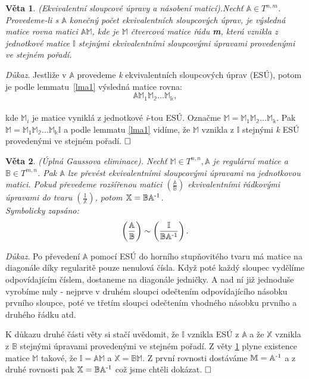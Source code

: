 \documentclass[12pt]{article}
\newtheorem{theorem}{Věta}[section]
\begin{document}
\begin{theorem}{\normalfont(Ekvivalentní sloupcové úpravy a násobení maticí).}\label{veta1}
Nechť  $\mathbb{A} \in T^{n,m}$. Provedeme-li s $\mathbb{A}$ konečný počet ekvivalentních sloupcových úprav, je výsledná matice rovna matici $\mathbb{AM}$, kde je $\mathbb{M}$ čtvercová matice řádu \textbf{m}, která vznikla z jednotkové matice $\mathbb{I}$ stejnými ekvivalentními sloupcovými úpravami provedenými ve stejném pořadí.
\end{theorem}

\textit{Důkaz}. Jestliže v $\mathbb{A}$ provedeme \textit{k} ekvivalentních sloupcových úprav (ESÚ), potom je podle lemmatu~\ref{lma1} výsledná matice rovna:
$$\mathbb{AM_\textit{1} M_\text{2} \dots M_\text{k},}$$
\\
kde $\mathbb{M_\textit{i}}$ je matice vyniklá z jednotkové \textit{i}-tou ESÚ.  Označme $\mathbb{M}=\mathbb{M_{\textit{1}} M_\text{2}  \dots M_\text{k}}$. Pak  \linebreak $\mathbb{M}=\mathbb{M_{\textit{1}} M_\text{2} \dots M_\text{k}I}$ a podle lemmatu \ref{lma1} vidíme, že $\mathbb{M}$ vznikla z $\mathbb{I}$ stejnými \textit{k} ESÚ provedenými ve stejném pořadí. $\hfill \Box$

\begin{theorem}{\normalfont(Úplná Gaussova eliminace).}
Nechť $\mathbb{M} \in T^{n,n}, \mathbb{A}$ je regulární matice a $\mathbb{B} \in T^{m,n}$. Pak $\mathbb{A}$ lze převést ekvivalentními sloupcovými úpravami na jednotkovou matici. Pokud převedeme rozšířenou matici $\left(\frac{\mathbb{A}}{\mathbb{B}} \right)$ ekvivalentními řádkovými úpravami do tvaru $\left(\frac{\mathbb{I}}{\mathbb{X}} \right)$, potom $\mathbb{X}=\mathbb{BA^{\text{\normalfont{-1}}}}$.
\\

	Symbolicky zapsáno:
	$$\left(\frac{\mathbb{A}}{\mathbb{B}} \right) \sim \left(\frac{\mathbb{I}}{\mathbb{BA^{\text{\normalfont{-1}}}}} \right).$$ %
\end{theorem}
\thispagestyle{empty}
\textit{Důkaz}. Po převedení $\mathbb{A}$ pomocí ESÚ do horního stupňovitého tvaru má matice na diagonále díky regularitě pouze nenulová čísla. Když poté každý sloupec vydělíme odpovídajícím číslem, dostaneme na diagonále jedničky. A nad ní již jednoduše vyrobíme nuly - nejprve v druhém sloupci odečtením odpovídajícího násobku prvního sloupce, poté ve třetím sloupci odečtením vhodného násobku prvního a druhého řádku atd.

K důkazu druhé části věty si stačí uvědomit, že $\mathbb{I}$ vznikla ESÚ z $\mathbb{A}$ a že $\mathbb{X}$ vznikla z $\mathbb{B}$ stejnými úpravami provedenými ve stejném pořadí. Z věty \ref{veta1} plyne existence matice $\mathbb{M}$ takové, že $\mathbb{I}=\mathbb{AM}$ a $\mathbb{X}=\mathbb{BM}$. Z první rovnosti dostáváme $\mathbb{M}=\mathbb{A^{\text{\normalfont{-1}}}}$ a z druhé rovnosti pak $\mathbb{X}=\mathbb{BA^{\text{\normalfont{-1}}}}$ což jsme chtěli dokázat. $\hfill \Box$
\\
\end{document}
